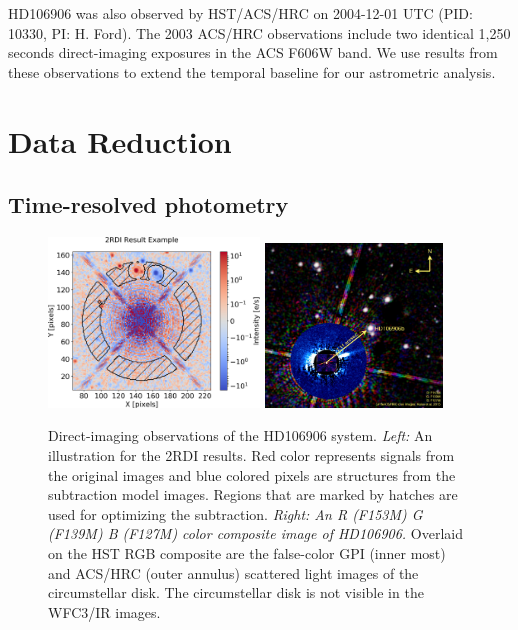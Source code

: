 \documentclass[twocolumn]{aastex62}
\begin{document}
HD106906 was also observed by HST/ACS/HRC on 2004-12-01 UTC (PID: 10330, PI: H. Ford). The 2003 ACS/HRC observations include two identical 1,250 seconds direct-imaging exposures in the ACS F606W  band. We use results  from these observations \citep{Bailey2013,Kalas2015} to extend the temporal baseline for our astrometric analysis.

\section{Data Reduction}

\subsection{Time-resolved photometry}
\begin{figure}
  \centering
  \includegraphics[width=0.5\textwidth]{figures/F153M_medianSubtractionMasked_rotation_01}  
  \includegraphics[width=0.42\textwidth]{figures/HD106906_RGB_composite}  
  \caption{Direct-imaging observations of the HD106906 system. \emph{Left:} An illustration for the 2RDI results. Red color represents signals from the original images and blue colored pixels are structures from the subtraction model images. Regions that are marked by hatches are used for optimizing the subtraction. \emph{Right: An R (F153M) G (F139M) B (F127M) color composite image of HD106906.} Overlaid on the HST RGB composite are the false-color GPI (inner most) and ACS/HRC (outer annulus) scattered light images \citep{Kalas2015} of the circumstellar disk. The circumstellar disk is not visible in the WFC3/IR images.}
  \label{fig:2rdi}
\end{figure}
\end{document}
